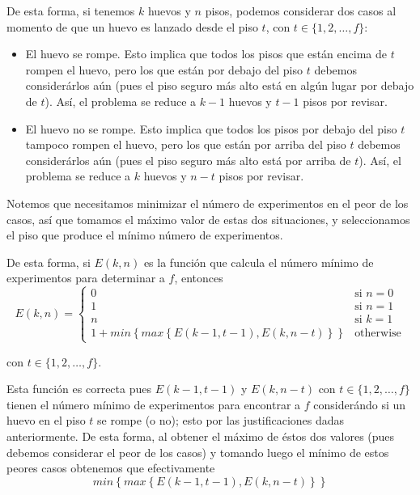 \documentclass[letterpaper,11pt]{article}
\begin{document}
\begin{enumerate}
\begin{enumerate}
        De esta forma, si tenemos $k$ huevos y $n$ pisos, podemos considerar 
        dos casos al momento de que un huevo es lanzado desde el piso $t$, 
        con $t \in \{1, 2, \ldots, f\}$:
        \begin{itemize}
            \item El huevo se rompe. Esto implica que todos los pisos que están
            encima de $t$ rompen el huevo, pero los que están por debajo del 
            piso $t$ debemos considerárlos aún (pues el piso seguro más alto 
            está en algún lugar por debajo de $t$). Así, el problema se reduce 
            a $k-1$ huevos y $t-1$ pisos por revisar.

            \item El huevo no se rompe. Esto implica que todos los pisos 
            por debajo del piso $t$ tampoco rompen el huevo, pero los que están 
            por arriba del piso $t$ debemos considerárlos aún (pues el piso 
            seguro más alto está por arriba de $t$). Así, el problema se  
            reduce a $k$ huevos y $n-t$ pisos por revisar. 
        \end{itemize}

        Notemos que necesitamos minimizar el número de experimentos en el peor 
        de los casos, así que tomamos el máximo valor de estas dos situaciones, 
        y seleccionamos el piso que produce el mínimo número de experimentos.

        De esta forma, si $E(k,n)$ es la función que calcula el número mínimo 
        de experimentos para determinar a $f$, entonces 
        \begin{equation*}
            E(k, n) = 
            \begin{cases}
                0 & \text{si $n =0$} \\
                1 & \text{si $n = 1$} \\
                n & \text{si $k = 1$} \\
                1 + min\left\{max\left\{E(k-1, t-1), E(k, n-t)\right\}\right\} & 
                \text{otherwise}
            \end{cases}
        \end{equation*}

        con $t \in \{1, 2, \ldots, f\}$.
    \end{enumerate}

    Esta función es correcta pues $E(k-1, t-1)$ y $E(k, n-t)$ con 
    $t \in \{1, 2, \ldots, f\}$ tienen el número mínimo de experimentos
    para encontrar a $f$ considerándo si un huevo en el piso $t$ se 
    rompe (o no); esto por las justificaciones dadas anteriormente. De 
    esta forma, al obtener el máximo de éstos dos valores (pues debemos 
    considerar el peor de los casos) y tomando luego el mínimo de estos 
    peores casos obtenemos que efectivamente 
    \begin{equation*}
        min\left\{max\left\{E(k-1, t-1), E(k, n-t)\right\}\right\}
    \end{equation*}


\end{enumerate}
\end{document}
